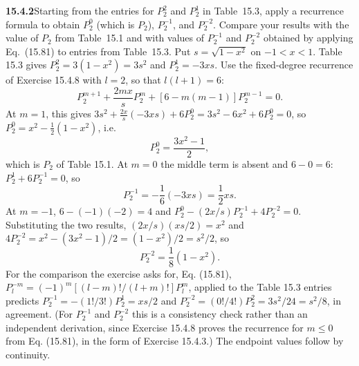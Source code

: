 \par\bigskip
\noindent\textbf{15.4.2}\quad Starting from the entries for $P_{2}^{2}$
and $P_{2}^{1}$ in Table~15.3, apply a recurrence formula to obtain
$P_{2}^{0}$ (which is $P_{2}$), $P_{2}^{-1}$, and $P_{2}^{-2}$.
Compare your results with the value of $P_{2}$ from Table~15.1 and
with values of $P_{2}^{-1}$ and $P_{2}^{-2}$ obtained by applying
Eq.~(15.81) to entries from Table~15.3.
\solution
Put $s=\sqrt{1-x^2}$ on $-1<x<1$.
Table 15.3 gives $P_2^2=3(1-x^2)=3s^2$ and $P_2^1=-3xs$.
Use the fixed-degree recurrence of Exercise 15.4.8 with $l=2$, so
that $l(l+1)=6$:
\[
P_2^{m+1}+\frac{2mx}{s}P_2^m+[6-m(m-1)]P_2^{m-1}=0.
\]
At $m=1$, this gives
$3s^2+\frac{2x}{s}(-3xs)+6P_2^0=3s^2-6x^2+6P_2^0=0$, so
$P_2^0=x^2-\frac12(1-x^2)$, i.e.
\[
\boxed{P_2^0=\frac{3x^2-1}{2}},
\]
which is $P_2$ of Table 15.1.
At $m=0$ the middle term is absent and $6-0=6$:
$P_2^1+6P_2^{-1}=0$, so
\[
\boxed{P_2^{-1}=-\frac16(-3xs)=\frac12xs}.
\]
At $m=-1$, $6-(-1)(-2)=4$ and
$P_2^0-(2x/s)P_2^{-1}+4P_2^{-2}=0$.
Substituting the two results, $(2x/s)(xs/2)=x^2$ and
$4P_2^{-2}=x^2-(3x^2-1)/2=(1-x^2)/2=s^2/2$, so
\[
\boxed{P_2^{-2}=\frac18(1-x^2)}.
\]
For the comparison the exercise asks for, Eq. (15.81),
$P_l^{-m}=(-1)^m[(l-m)!/(l+m)!]P_l^m$, applied to the Table 15.3
entries predicts
$P_2^{-1}=-(1!/3!)P_2^1=xs/2$ and
$P_2^{-2}=(0!/4!)P_2^2=3s^2/24=s^2/8$, in agreement.
(For $P_2^{-1}$ and $P_2^{-2}$ this is a consistency check rather than
an independent derivation, since Exercise 15.4.8 proves the recurrence
for $m\le0$ from Eq. (15.81), in the form of Exercise 15.4.3.)
The endpoint values follow by continuity.

